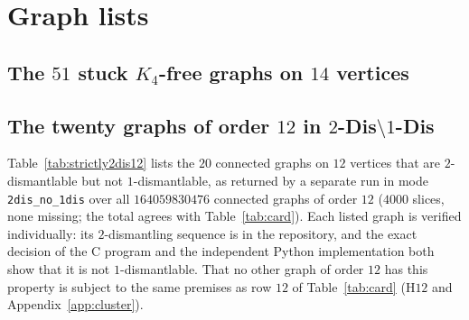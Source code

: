 \section{Graph lists}\label{app:lists}

\subsection{\texorpdfstring{The $51$ stuck $K_4$-free graphs on $14$ vertices}{The 51 stuck K4-free graphs on 14 vertices}}\label{app:stuck51}
\scriptsize

\normalsize

\subsection{\texorpdfstring{The twenty graphs of order $12$ in $2$-Dis$\setminus1$-Dis}{The twenty graphs of order 12 in 2-Dis minus 1-Dis}}\label{app:strictly2dis12}
Table~\ref{tab:strictly2dis12} lists the $20$ connected graphs on $12$ vertices that are $2$-dismantlable but not $1$-dismantlable, as returned by a separate run in mode \texttt{2dis\_no\_1dis} over all $\num{164059830476}$ connected graphs of order $12$ ($\num{4000}$ slices, none missing; the total agrees with Table~\ref{tab:card}). Each listed graph is verified individually: its $2$-dismantling sequence is in the repository, and the exact decision of the C program and the independent Python implementation both show that it is not $1$-dismantlable. That no other graph of order $12$ has this property is subject to the same premises as row $12$ of Table~\ref{tab:card} ($\mathrm{H12}$ and Appendix~\ref{app:cluster}).

\begin{table}[ht]
\centering\footnotesize
\caption{The $20$ connected graphs on $12$ vertices in $2\text{-Dis}\setminus1\text{-Dis}$: $m$ edges, $t$ triangles, the number of $K_4$ subgraphs, clique number $\omega$, minimum and maximum degree $\delta,\Delta$, and the order of the automorphism group.}\label{tab:strictly2dis12}

\end{table}
\FloatBarrier
